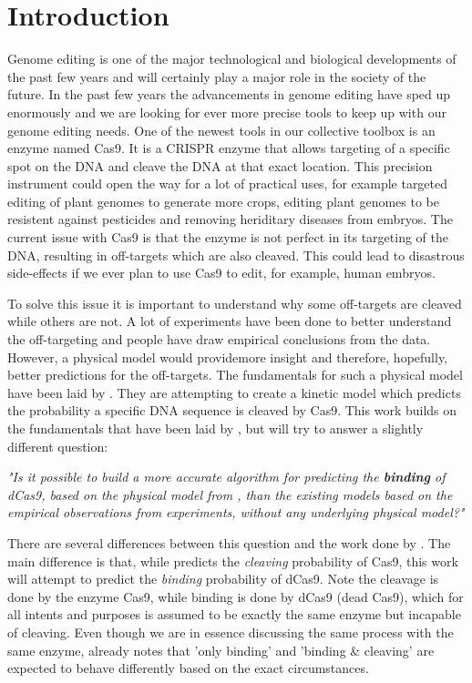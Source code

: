 \chapter{Introduction}

Genome editing is one of the major technological and biological developments of the past few years and will certainly play a major role in the society of the future. In the past few years the advancements in genome editing have sped up enormously and we are looking for ever more precise tools to keep up with our genome editing needs. One of the newest tools in our collective toolbox is an enzyme named Cas9. It is a CRISPR enzyme that allows targeting of a specific spot on the DNA and cleave the DNA at that exact location. This precision instrument could open the way for a lot of practical uses, for example targeted editing of plant genomes to generate more crops, editing plant genomes to be resistent against pesticides and removing heriditary diseases from embryos. The current issue with Cas9 is that the enzyme is not perfect in its targeting of the DNA, resulting in off-targets which are also cleaved. This could lead to disastrous side-effects if we ever plan to use Cas9 to edit, for example, human embryos.

To solve this issue it is important to understand why some off-targets are cleaved while others are not. A lot of experiments have been done to better understand the off-targeting and people have draw empirical conclusions from the data. However, a physical model would providemore insight and therefore, hopefully, better predictions for the off-targets. The fundamentals for such a physical model have been laid by \cite{Misha}. They are attempting to create a kinetic model which predicts the probability a specific DNA sequence is cleaved by Cas9. This work builds on the fundamentals that have been laid by \cite{Misha}, but will try to answer a slightly different question:

\begin{center}
\emph{"Is it possible to build a more accurate algorithm for predicting the \textbf{binding} of dCas9, based on the physical model from \cite{Misha}, than the existing models based on the empirical observations from experiments, without any underlying physical model?"}
\end{center}

There are several differences between this question and the work done by \cite{Misha}. The main difference is that, while \cite{Misha} predicts the \emph{cleaving} probability of Cas9, this work will attempt to predict the \emph{binding} probability of dCas9. Note the cleavage is done by the enzyme Cas9, while binding is done by dCas9 (dead Cas9), which for all intents and purposes is assumed to be exactly the same enzyme but incapable of cleaving. Even though we are in essence discussing the same process with the same enzyme, \cite{Misha} already notes that 'only binding' and 'binding \& cleaving' are expected to behave differently based on the exact circumstances.

